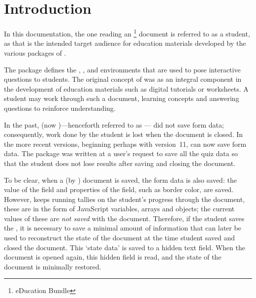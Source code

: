 \documentclass{article}
\makeatletter
\def\hisher{\@ifstar{\hisheri}{\global\advance\hesheCnt1\relax\hisheri}}
\def\hisheri{\ifodd\hesheCnt her\else his\fi}
\makeatother
\begin{document}
\maketitle

\tableofcontents
{}

\section{Introduction}

In this documentation, the one reading an \AEB\footnote{{\AcroTeX} eDucation
Bundle} document is referred to as a student, as that is the intended target
audience for education materials developed by the various packages of \AEB.

The  package defines the , , and
 environments that are used to pose interactive questions to
students. The original concept of  was as an integral component
in the development of education materials such as digital tutorials or
worksheets. A student may work through such a document, learning concepts and
answering questions to reinforce {\hisher} understanding.

In the past,  (now )---henceforth
referred to as --- did not save form data; consequently, work done by
the student is lost when the document is closed. In the more recent versions,
beginning perhaps with version~11,  can now save form data. The
 package was written at a user's request to save all the quiz
data so that the student does not lose {\hisher} results after saving and
closing the document.

To be clear, when a {\PDF} (by ) document is saved, the form data is
also saved: the value of the field and properties of the field, such as
border color, are saved. However,  keeps running tallies on the
student's progress through the document, these are in the form of JavaScript
variables, arrays and objects; the current values of these are \emph{not
saved} with the document. Therefore, if the student saves the \PDF, it is
necessary to save a minimal amount of information that can later be used to
reconstruct the state of the document at the time student saved and closed the
document. This `state data' is saved to a hidden text field. When the
document is opened again, this hidden field is read, and the state of the
document is minimally restored.
\end{document}

